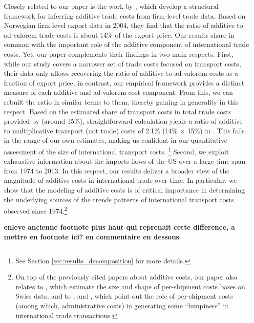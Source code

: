 \documentclass[a4paper,11pt]{article}
\begin{document}
Closely related to our paper is the work by \citet{Irrazabal_2015}, which develop a structural framework for inferring additive trade costs from firm-level trade data. Based on Norwegian firm-level export data in 2004, they find that the ratio of additive to ad-valorem trade costs is about 14\% of the export price. Our results share in common with \citet{Irrazabal_2015} the important role of the additive component of international trade costs. Yet, our paper complements their findings in two main respects. First, while our study covers a narrower set of trade costs focused on transport costs, their data only allows recovering the ratio of additive to ad-valorem costs as a fraction of export price; in contrast, our empirical framework provides a distinct measure of each additive and ad-valorem cost component. From this, we can rebuilt the ratio in similar terms to them, thereby gaining in generality in this respect. Based on the estimated share of transport costs in total trade costs provided by \citet{anderson_wincoop_jel} (around 15\%), straightforward calculation yields a ratio of additive to multiplicative transport (not trade) costs of 2.1\% (14\% $\times$ 15\%) in \citet{Irrazabal_2015}. This falls in the range of our own estimates, making us confident in our quantitative assessment of the size of international transport costs. \footnote{See Section \ref{sec:results_decomposition} for more details.} Second, we exploit exhaustive information about the imports flows of the US over a large time span from 1974 to 2013. In this respect, our results deliver a broader view of the magnitude of additive costs in international trade over time. In particular, we show that the modeling of additive costs is of critical importance in determining the underlying sources of the trends patterns of international transport costs observed since 1974.\footnote{On top of the previously cited papers about additive costs, our paper also relates to \citet{Kropf-Saure-JIE-2016}, which estimate the size and shape of per-shipment costs bases on Swiss data, and to \citet{Alessandria-et-al-AER-2010}, \citet{Hornok-et-al-RES-2015} and \citet{Hornok-et-al-JIE-2015}, which point out the role of per-shipment costs (among which, administrative costs) in generating some ``lumpiness'' in international trade transactions.} \smallskip

\textbf{enleve ancienne footnote plus haut qui reprenait cette difference, a mettre en footnote ici? en commentaire en dessous}
\end{document}
